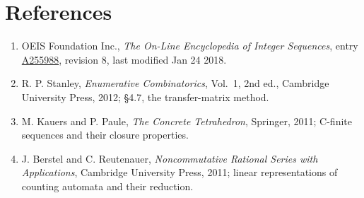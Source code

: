 \documentclass[11pt]{article}
\theoremstyle{definition}
\begin{document}
\section{References}

\begin{enumerate}

\item OEIS Foundation Inc., \emph{The On-Line Encyclopedia of Integer Sequences}, entry \href{https://oeis.org/A255988}{A255988}, revision 8, last modified Jan 24 2018.

\item R. P. Stanley, \emph{Enumerative Combinatorics}, Vol.~1, 2nd ed., Cambridge University Press, 2012; \S4.7, the transfer-matrix method.

\item M. Kauers and P. Paule, \emph{The Concrete Tetrahedron}, Springer, 2011; C-finite sequences and their closure properties.

\item J. Berstel and C. Reutenauer, \emph{Noncommutative Rational Series with Applications}, Cambridge University Press, 2011; linear representations of counting automata and their reduction.

\end{enumerate}
\end{document}
